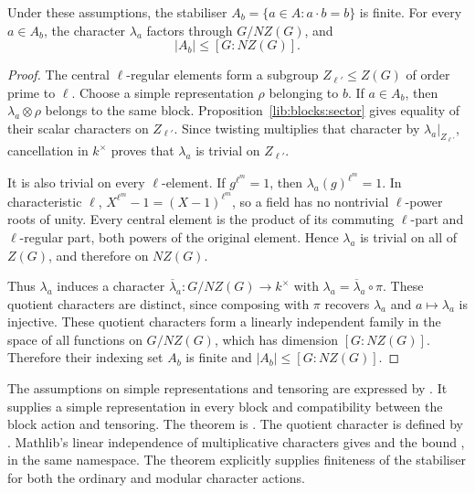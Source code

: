 \begin{theorem}
\label{lib:blocks:stabiliser-bound}
Under these assumptions, the stabiliser
$A_b=\{a\in A:a\cdot b=b\}$ is finite. For every $a\in A_b$, the
character $\lambda_a$ factors through $G/NZ(G)$, and
\[
 |A_b|\leq [G:NZ(G)].
\]
\end{theorem}
\begin{proof}
The central $\ell$-regular elements form a subgroup
$Z_{\ell'}\leq Z(G)$ of order prime to $\ell$.
Choose a simple representation $\rho$ belonging to $b$. If $a\in A_b$,
then $\lambda_a\otimes\rho$ belongs to the same block.
Proposition~\ref{lib:blocks:sector} gives equality of their scalar characters on
$Z_{\ell'}$. Since twisting multiplies that character by
$\lambda_a|_{Z_{\ell'}}$, cancellation in $k^\times$ proves that
$\lambda_a$ is trivial on $Z_{\ell'}$.

It is also trivial on every $\ell$-element. If $g^{\ell^m}=1$, then
$\lambda_a(g)^{\ell^m}=1$. In characteristic $\ell$,
$X^{\ell^m}-1=(X-1)^{\ell^m}$, so a field has no nontrivial
$\ell$-power roots of unity. Every central element is the product
of its commuting $\ell$-part and $\ell$-regular part, both powers
of the original element. Hence $\lambda_a$ is trivial on all of
$Z(G)$, and therefore on $NZ(G)$.

Thus $\lambda_a$ induces a character
$\overline\lambda_a:G/NZ(G)\to k^\times$ with
$\lambda_a=\overline\lambda_a\circ\pi$. These quotient characters
are distinct, since composing with $\pi$ recovers $\lambda_a$ and
$a\mapsto\lambda_a$ is injective. These quotient characters form a
linearly independent family in the space of all functions on
$G/NZ(G)$, which has dimension $[G:NZ(G)]$. Therefore their indexing
set $A_b$ is finite and $|A_b|\leq [G:NZ(G)]$.
\end{proof}

\begin{implementation}
The assumptions on simple representations and tensoring are expressed by
.
It supplies a simple representation in every block and compatibility
between the block action and tensoring. The theorem is
.
The quotient character is defined by .
Mathlib's linear independence of multiplicative characters gives
 and the bound
, in the same namespace.
The theorem  explicitly supplies finiteness
of the stabiliser for both the ordinary and modular character actions.
\end{implementation}

